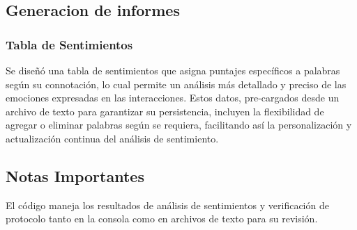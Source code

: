 \subsection{Generacion de informes}

\subsubsection{Tabla de Sentimientos}
Se diseñó una tabla de sentimientos que asigna puntajes específicos a palabras según su
connotación, lo cual permite un análisis más detallado y preciso de las emociones expresadas en
las interacciones. Estos datos, pre-cargados desde un archivo de texto para garantizar su
persistencia, incluyen la flexibilidad de agregar o eliminar palabras según se requiera,
    facilitando así la personalización y actualización continua del análisis de sentimiento.

    \newpage

    \subsection*{Notas Importantes}
    El código maneja los resultados de análisis de sentimientos y verificación de protocolo tanto
    en la consola como en archivos de texto para su revisión.
